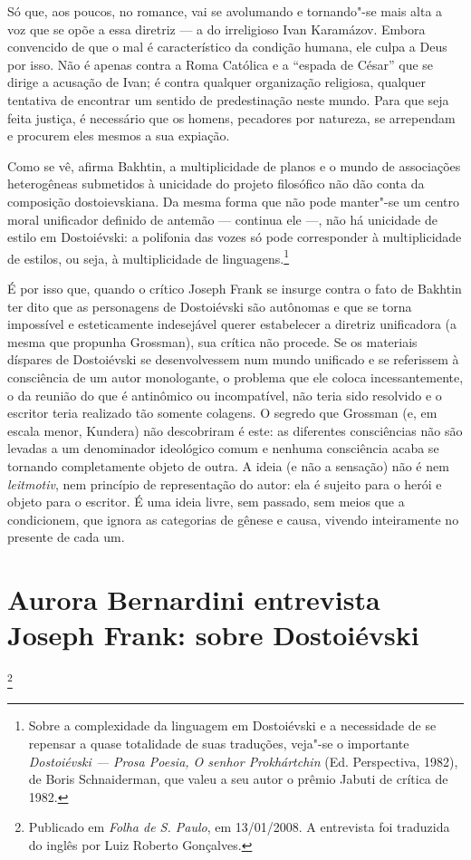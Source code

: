 Só que, aos poucos, no romance, vai se avolu­mando e tornando"-se mais
alta a voz que se opõe a essa diretriz --- a do irreligioso Ivan
Karamázov. Embora convencido de que o mal é característico da condição
humana, ele culpa a Deus por isso. Não é apenas contra a Roma Católica e
a ``espada de César'' que se dirige a acusação de Ivan; é contra
qualquer organização religiosa, qualquer tentativa de encontrar um
sentido de predestinação neste mundo. Para que seja feita justiça, é
necessário que os homens, pecadores por natureza, se arrependam e
procu­rem eles mesmos a sua expiação.

Como se vê, afirma Bakhtin, a multiplicidade de planos e o mundo de
associações heterogêneas submetidos à unicidade do projeto filosófico
não dão conta da composição dostoievskiana. Da mesma forma que não pode
manter"-se um centro moral unificador definido de antemão --- continua ele
---, não há unicidade de estilo em Dostoiévski: a polifonia das vozes só
pode corresponder à multiplicidade de estilos, ou seja, à multiplicidade
de linguagens.\footnote{Sobre a complexidade da linguagem em Dostoiévski
e a necessidade de se repensar a quase totalidade de suas traduções,
veja"-se o importante \emph{Dostoiévski --- Prosa Poesia, O senhor
Prokhártchin} (Ed. Perspectiva, 1982), de Boris Schnaiderman, que
valeu a seu autor o prêmio Jabuti de crítica de 1982.}

É por isso que, quando o crítico Joseph Frank se insurge contra o fato
de Bakhtin ter dito que as personagens de Dostoiévski são autônomas e
que se torna impossível e esteticamente indesejável querer estabelecer a
diretriz unificadora (a mesma que propunha Grossman), sua crítica não
procede. Se os materiais díspares de Dostoiévski se desenvolvessem num
mundo unificado e se referissem à consciência de um autor monologante, o
problema que ele coloca incessantemente, o da reunião do que é
antinômico ou incompatível, não teria sido resolvido e o escritor teria
realizado tão somente colagens. O segredo que Grossman (e, em escala
menor, Kundera) não descobriram é este: as diferentes consciências não
são levadas a um denominador ideológico comum e nenhuma consciência
acaba se tornando completamente objeto de outra. A ideia (e não a
sensação) não é nem \emph{leitmotiv}, nem princípio de representação do
autor: ela é sujeito para o herói e objeto para o escritor. É uma ideia
livre, sem passado, sem meios que a condicionem, que ignora as
categorias de gênese e causa, vivendo inteiramente no presente de cada
um.

\chapter*{Aurora Bernardini entrevista Joseph Frank: sobre Dostoiévski}\footnote{Publicado em \emph{Folha de S. Paulo}, em 13/01/2008. A entrevista foi traduzida do inglês por Luiz Roberto Gonçalves.}

